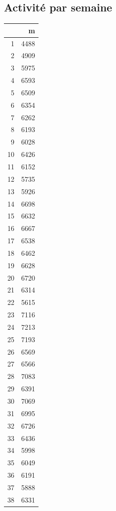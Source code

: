 \documentclass[12pt,english,french,twoside]{report}\usepackage[]{graphicx}\usepackage[]{color}
\begin{document}
\subsection*{Activité par semaine}

\begin{table}[ht]
\centering
\begin{tabular}{rr}
  \hline
 & m \\ 
  \hline
1 & 4488 \\ 
  2 & 4909 \\ 
  3 & 5975 \\ 
  4 & 6593 \\ 
  5 & 6509 \\ 
  6 & 6354 \\ 
  7 & 6262 \\ 
  8 & 6193 \\ 
  9 & 6028 \\ 
  10 & 6426 \\ 
  11 & 6152 \\ 
  12 & 5735 \\ 
  13 & 5926 \\ 
  14 & 6698 \\ 
  15 & 6632 \\ 
  16 & 6667 \\ 
  17 & 6538 \\ 
  18 & 6462 \\ 
  19 & 6628 \\ 
  20 & 6720 \\ 
  21 & 6314 \\ 
  22 & 5615 \\ 
  23 & 7116 \\ 
  24 & 7213 \\ 
  25 & 7193 \\ 
  26 & 6569 \\ 
  27 & 6566 \\ 
  28 & 7083 \\ 
  29 & 6391 \\ 
  30 & 7069 \\ 
  31 & 6995 \\ 
  32 & 6726 \\ 
  33 & 6436 \\ 
  34 & 5998 \\ 
  35 & 6049 \\ 
  36 & 6191 \\ 
  37 & 5888 \\ 
  38 & 6331 \\ 

\end{tabular}
\end{table}
\end{document}
